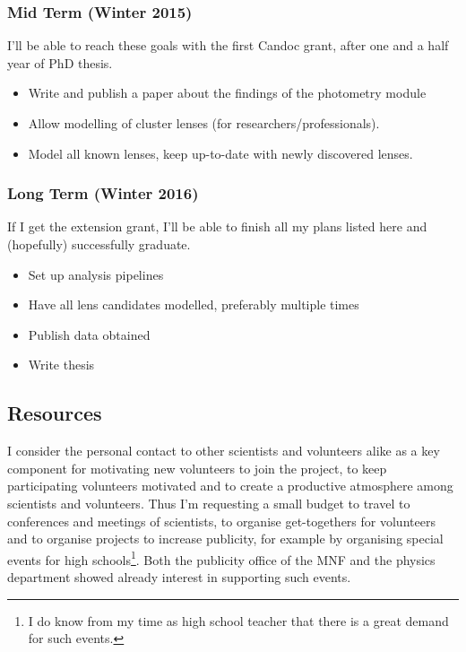 \documentclass[11pt]{article}
\begin{document}
\subsubsection{Mid Term (Winter 2015)} \label{sec:plan_mid}
I'll be able to reach these goals with the first Candoc grant, after one and a half year of PhD thesis.

\begin{itemize}
  \item Write and publish a paper about the findings of the photometry module
  \item Allow modelling of cluster lenses (for researchers/professionals).
  \item Model all known lenses, keep up-to-date with newly discovered lenses.
\end{itemize}



\subsubsection{Long Term (Winter 2016)} \label{sec:plan_long}
If I get the extension grant, I'll be able to finish all my plans listed here and (hopefully) successfully graduate.

\begin{itemize}
  \item Set up analysis pipelines
  \item Have all lens candidates modelled, preferably multiple times
  \item Publish data obtained
  \item Write thesis
\end{itemize}
  
  

\subsection{Resources}

I consider the personal contact to other scientists and volunteers alike as a key component for motivating new volunteers to join the project, to keep participating volunteers motivated and to create a productive atmosphere among scientists and volunteers.
Thus I'm requesting a small budget to travel to conferences and meetings of scientists, to organise get-togethers for volunteers and to organise projects to increase publicity, for example by organising special events for high schools\footnote{I do know from my time as high school teacher that there is a great demand for such events.}. Both the publicity office of the MNF and the physics department showed already interest in supporting such events.
\end{document}

